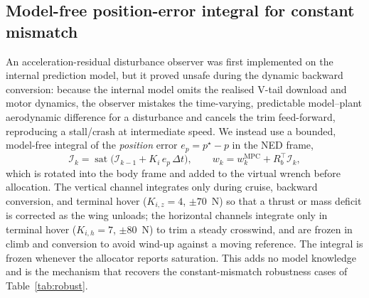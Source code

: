 \documentclass[preprint,3p,11pt]{elsarticle}
\begin{document}
\subsection{Model-free position-error integral for constant mismatch}\label{sec:integral}
An acceleration-residual disturbance observer was first implemented on the
internal prediction model, but it proved unsafe during the dynamic backward
conversion: because the internal model omits the realised V-tail download and
motor dynamics, the observer mistakes the time-varying, predictable
model--plant aerodynamic difference for a disturbance and cancels the trim
feed-forward, reproducing a stall/crash at intermediate speed. We instead use
a bounded, model-free integral of the \emph{position} error
$e_p=p^\star-p$ in the NED frame,
\begin{equation}
\mathcal I_k = \operatorname{sat}\!\bigl(\mathcal I_{k-1}+K_i\,e_p\,\Delta t\bigr),
\qquad
w_k = w_k^{\mathrm{MPC}}+R_b^\top\mathcal I_k ,
\label{eq:integral}
\end{equation}
which is rotated into the body frame and added to the virtual wrench before
allocation. The vertical channel integrates only during cruise, backward
conversion, and terminal hover ($K_{i,z}=4$, $\pm70$~N) so that a thrust or
mass deficit is corrected as the wing unloads; the horizontal channels
integrate only in terminal hover ($K_{i,h}=7$, $\pm80$~N) to trim a steady
crosswind, and are frozen in climb and conversion to avoid wind-up against a
moving reference. The integral is frozen whenever the allocator reports
saturation. This adds no model knowledge and is the mechanism that recovers
the constant-mismatch robustness cases of Table~\ref{tab:robust}.
\end{document}
